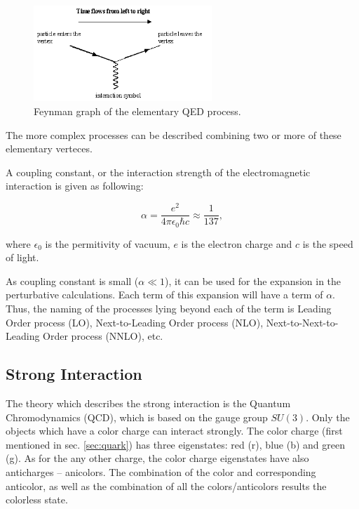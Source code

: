 \begin{figure}[h]
  \centering
  \includegraphics[width=0.6\textwidth]{01_Theory_SM/plots/QED_simple.png}
  \caption{Feynman graph of the elementary QED process.}
  \label{fig:QED_simple}
\end{figure}

The more complex processes can be described combining two or more of these elementary verteces.

A coupling constant, or the interaction strength of the electromagnetic interaction is given as following:

\begin{equation}
 \alpha = \frac{e^{2}}{4\pi\epsilon_{0}\hbar c} \approx \frac{1}{137},
\end{equation}

where $\epsilon_{0}$ is the permitivity of vacuum, $e$ is the electron charge and $c$ is the speed of light.

As coupling constant is small ($\alpha \ll 1$), it can be used for the expansion in the perturbative calculations.
Each term of this expansion will have a term of $\alpha$. Thus, the naming of the processes lying beyond each of the term
is Leading Order process (LO), Next-to-Leading Order process (NLO), Next-to-Next-to-Leading Order process (NNLO), etc.

\subsection{Strong Interaction}

The theory which describes the strong interaction is the Quantum Chromodynamics (QCD), which is based on the gauge group $SU(3)$. Only the
objects which have a color charge can interact strongly. The color charge (first mentioned in sec. \ref{sec:quark}) has three eigenstates:
red (r), blue (b) and green (g). As for the any other charge, the color charge eigenstates have also anticharges -- anicolors. The combination
of the color and corresponding anticolor, as well as the combination of all the colors/anticolors results the colorless state.

